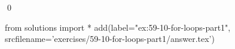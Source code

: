 
\begin{ex}
  \label{ex:59-10-for-loops-part1}
  
  \qed
\end{ex}
\begin{python0}
from solutions import *
add(label="ex:59-10-for-loops-part1",
    srcfilename='exercises/59-10-for-loops-part1/answer.tex')
\end{python0}
